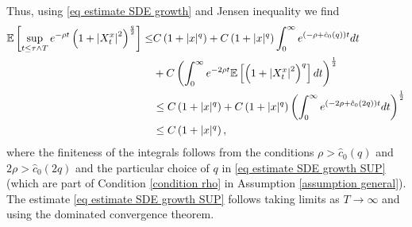 \documentclass[11pt]{amsart}
\theoremstyle{plain}
\def \dd{{\rm d}}
\numberwithin{equation}{section}
\begin{document}
Thus, using \eqref{eq estimate SDE growth} and Jensen inequality we find
$$
\begin{aligned} 
\mathbb{E}\left[\sup _{t \leq \tau \land T} e^{-\rho t}\left(1+\left|X_{t}^{x}\right|^{2}\right)^{\frac{q}{2}}\right] \leq& C \left(1+|x|^{q}\right) + C \left(1+|x|^{q}\right) \int_{0}^{\infty} e^{\left(-\rho + \hat{c}_{0}(q) \right) t} \dd t \\
& 
+ C \left(\int_{0}^{\infty} e^{-2 \rho t} \mathbb{E} \left[ \left(1+\left|X_{t}^{x}\right|^{2}\right)^{q}\right] \dd t\right)^{\frac{1}{2}} \\
& \leq C\left(1+|x|^{q}\right)
+C\left(1+|x|^{q}\right) \left(\int_{0}^{\infty} e^{(-2 \rho + \hat c _0 (2q) )t} \dd t\right)^{\frac{1}{2}} \\
& \leq C \left(1+|x|^{q}\right), 
\end{aligned}
$$
where the finiteness of the integrals follows from the conditions $\rho > \hat c _0(q)$ and $2 \rho > \hat c _0 (2q)$ and the particular choice of $q$ in \eqref{eq estimate SDE growth SUP} (which are part of Condition \ref{condition rho} in Assumption \ref{assumption general}).
The estimate \eqref{eq estimate SDE growth SUP} follows taking limits as $T \to  \infty$ and using the dominated convergence theorem.
\end{document}

